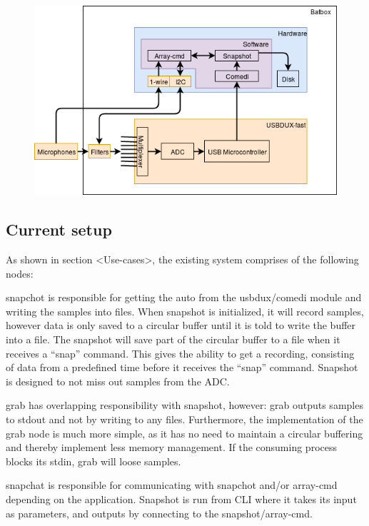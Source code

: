 \begin{figure}[h!]
	\includegraphics[width=1\textwidth]{figures/existing-system-overview.png} 
\end{figure}


\subsection{Current setup}

As shown in section <Use-cases>, the existing system comprises of the following nodes:

snapchot is responsible for getting the auto from the usbdux/comedi module and writing the samples into files. When snapshot is initialized, it will record samples, however data is only saved to a circular buffer until it is told to write the buffer into a file. The snapshot will save part of the circular buffer to a file when it receives a “snap” command. This gives the ability to get a recording, consisting of data from a predefined time before it receives the “snap” command. Snapshot is designed to not miss out samples from the ADC.

grab has overlapping responsibility with snapshot, however: grab outputs samples to stdout and not by writing to any files. Furthermore, the implementation of the grab node is much more simple, as it has no need to maintain a circular buffering and thereby implement less memory management. If the consuming process blocks its stdin, grab will loose samples.

snapchat is responsible for communicating with snapchot and/or array-cmd depending on the application. Snapshot is run from CLI where it takes its input as parameters, and outputs by connecting to the snapshot/array-cmd.

